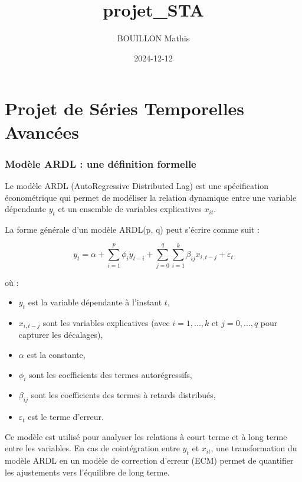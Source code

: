 \documentclass[
]{article}
\title{projet\_STA}
\author{BOUILLON Mathis}
\date{2024-12-12}
\providecommand{\tightlist}{%
  \setlength{\itemsep}{0pt}\setlength{\parskip}{0pt}}
\begin{document}
\maketitle

\hypertarget{projet-de-suxe9ries-temporelles-avancuxe9es}{%
\section{Projet de Séries Temporelles
Avancées}\label{projet-de-suxe9ries-temporelles-avancuxe9es}}

\hypertarget{moduxe8le-ardl-une-duxe9finition-formelle}{%
\subsubsection{Modèle ARDL : une définition
formelle}\label{moduxe8le-ardl-une-duxe9finition-formelle}}

Le modèle ARDL (AutoRegressive Distributed Lag) est une spécification
économétrique qui permet de modéliser la relation dynamique entre une
variable dépendante \(y_t\) et un ensemble de variables explicatives
\(x_{it}\).

La forme générale d'un modèle ARDL(p, q) peut s'écrire comme suit :

\[
y_t = \alpha + \sum_{i=1}^p \phi_i y_{t-i} + \sum_{j=0}^q \sum_{i=1}^k \beta_{ij} x_{i,t-j} + \varepsilon_t
\]

où :

\begin{itemize}
\tightlist
\item
  \(y_t\) est la variable dépendante à l'instant \(t\),
\item
  \(x_{i,t-j}\) sont les variables explicatives (avec \(i = 1, ..., k\)
  et \(j = 0, ..., q\) pour capturer les décalages),
\item
  \(\alpha\) est la constante,
\item
  \(\phi_i\) sont les coefficients des termes autorégressifs,
\item
  \(\beta_{ij}\) sont les coefficients des termes à retards distribués,
\item
  \(\varepsilon_t\) est le terme d'erreur.
\end{itemize}

Ce modèle est utilisé pour analyser les relations à court terme et à
long terme entre les variables. En cas de cointégration entre \(y_t\) et
\(x_{it}\), une transformation du modèle ARDL en un modèle de correction
d'erreur (ECM) permet de quantifier les ajustements vers l'équilibre de
long terme.
\end{document}
